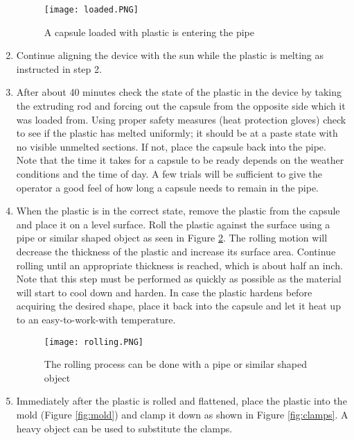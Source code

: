 \documentclass[11pt,english]{article}
\begin{document}
\begin{enumerate}
\begin{figure}[ht!]
\centering
\texttt{[image: loaded.PNG]}
\caption{A capsule loaded with plastic is entering the pipe}
\label{fig:loaded}
\end{figure}

\item Continue aligning the device with the sun while the plastic is melting as instructed in step 2.
\begin{center}
\end{center}
\item After about 40 minutes check the state of the plastic in the device by taking the extruding rod and forcing out the capsule from the opposite side which it was loaded from. Using proper safety measures (heat protection gloves) check to see if the plastic has melted uniformly; it should be at a paste state with no visible unmelted sections. If not, place the capsule back into the pipe.\\ 
Note that the time it takes for a capsule to be ready depends on the weather conditions and the time of day. A few trials will be sufficient to give the operator a good feel of how long a capsule needs to remain in the pipe.
\item When the plastic is in the correct state, remove the plastic from the capsule and place it on a level surface. Roll the plastic against the surface using a pipe or similar shaped object as seen in Figure \ref{fig:rolling}. The rolling motion will decrease the thickness of the plastic and increase its surface area. Continue rolling until an appropriate thickness is reached, which is about half an inch.\\
Note that this step must be performed as quickly as possible as the material will start to cool down and harden. In case the plastic hardens before acquiring the desired shape, place it back into the capsule and let it heat up to an easy-to-work-with temperature.

\begin{figure}[ht!]
\centering
\texttt{[image: rolling.PNG]}
\caption{The rolling process can be done with a pipe or similar shaped object}
\label{fig:rolling}
\end{figure}

\newpage
\item Immediately after the plastic is rolled and flattened, place the plastic into the mold (Figure \ref{fig:mold}) and clamp it down as shown in Figure \ref{fig:clamps}. A heavy object can be used to substitute the clamps.


\end{enumerate}
\end{document}
